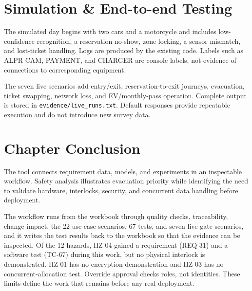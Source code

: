 \section{Simulation \& End-to-end Testing}

The simulated day begins with two cars and a motorcycle and includes low-confidence recognition, a reservation no-show, zone locking, a sensor mismatch, and lost-ticket handling. Logs are produced by the existing code. Labels such as ALPR CAM, PAYMENT, and CHARGER are console labels, not evidence of connections to corresponding equipment.

The seven live scenarios add entry/exit, reservation-to-exit journeys, evacuation, ticket swapping, network loss, and EV/monthly-pass operation. Complete output is stored in \texttt{evidence/live\_runs.txt}. Default responses provide repeatable execution and do not introduce new survey data.

\section{Chapter Conclusion}
The tool connects requirement data, models, and experiments in an inspectable workflow. Safety analysis illustrates evacuation priority while identifying the need to validate hardware, interlocks, security, and concurrent data handling before deployment.

The workflow runs from the workbook through quality checks, traceability, change impact, the 22 use-case scenarios, 67 tests, and seven live gate scenarios, and it writes the test results back to the workbook so that the evidence can be inspected. Of the 12 hazards, HZ-04 gained a requirement (REQ-31) and a software test (TC-67) during this work, but no physical interlock is demonstrated. HZ-01 has no encryption demonstration and HZ-03 has no concurrent-allocation test. Override approval checks roles, not identities. These limits define the work that remains before any real deployment.
